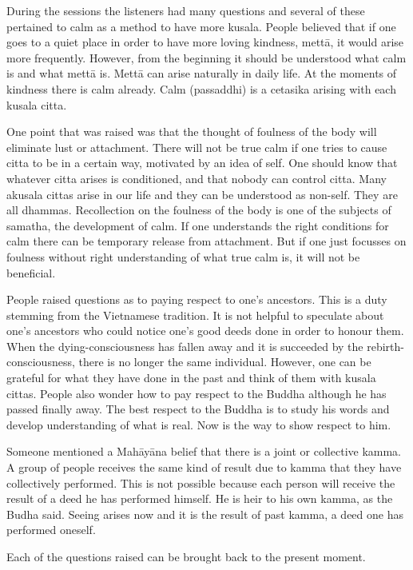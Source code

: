 During the sessions the listeners had many questions and several of
these pertained to calm as a method to have more kusala. People believed
that if one goes to a quiet place in order to have more loving kindness,
mettā, it would arise more frequently. However, from the beginning it
should be understood what calm is and what mettā is. Mettā can arise
naturally in daily life. At the moments of kindness there is calm
already. Calm (passaddhi) is a cetasika arising with each kusala citta.

One point that was raised was that the thought of foulness of the body
will eliminate lust or attachment. There will not be true calm if one
tries to cause citta to be in a certain way, motivated by an idea of
self. One should know that whatever citta arises is conditioned, and
that nobody can control citta. Many akusala cittas arise in our life and
they can be understood as non-self. They are all dhammas. Recollection
on the foulness of the body is one of the subjects of samatha, the
development of calm. If one understands the right conditions for calm
there can be temporary release from attachment. But if one just focusses
on foulness without right understanding of what true calm is, it will
not be beneficial.

People raised questions as to paying respect to one's ancestors. This is
a duty stemming from the Vietnamese tradition. It is not helpful to
speculate about one's ancestors who could notice one's good deeds done
in order to honour them. When the dying-consciousness has fallen away
and it is succeeded by the rebirth-consciousness, there is no longer the
same individual. However, one can be grateful for what they have done in
the past and think of them with kusala cittas. People also wonder how to
pay respect to the Buddha although he has passed finally away. The best
respect to the Buddha is to study his words and develop understanding of
what is real. Now is the way to show respect to him.

Someone mentioned a Mahāyāna belief that there is a joint or collective
kamma. A group of people receives the same kind of result due to kamma
that they have collectively performed. This is not possible because each
person will receive the result of a deed he has performed himself. He is
heir to his own kamma, as the Budha said. Seeing arises now and it is
the result of past kamma, a deed one has performed oneself.

Each of the questions raised can be brought back to the present moment.

